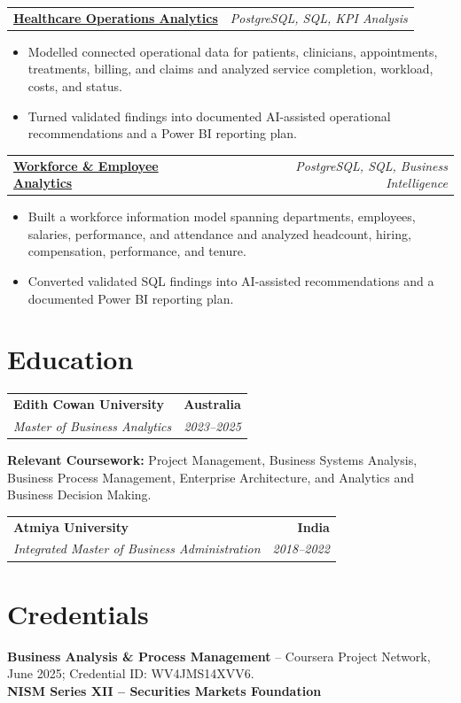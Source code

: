 \documentclass[letterpaper,10pt]{article}
\makeatletter
\newcommand{\role}[4]{%
  \begin{tabularx}{\textwidth}{@{}Xr@{}}
    \textbf{#1} & \textbf{#2} \\
    \textit{#3} & \textit{#4}
  \end{tabularx}\vspace{-1pt}
}
\newcommand{\project}[2]{%
  \begin{tabularx}{\textwidth}{@{}Xr@{}}
    \textbf{#1} & \textit{#2}
  \end{tabularx}\vspace{-1pt}
}
\makeatother
\begin{document}
\project{\href{https://github.com/jainalimehta/Healthcare-Analytics}{Healthcare Operations Analytics}}{PostgreSQL, SQL, KPI Analysis}
\begin{itemize}
  \item Modelled connected operational data for patients, clinicians, appointments, treatments, billing, and claims and analyzed service completion, workload, costs, and status.
  \item Turned validated findings into documented AI-assisted operational recommendations and a Power BI reporting plan.
\end{itemize}
\vspace{1pt}

\project{\href{https://github.com/jainalimehta/HR-Analytics}{Workforce \& Employee Analytics}}{PostgreSQL, SQL, Business Intelligence}
\begin{itemize}
  \item Built a workforce information model spanning departments, employees, salaries, performance, and attendance and analyzed headcount, hiring, compensation, performance, and tenure.
  \item Converted validated SQL findings into AI-assisted recommendations and a documented Power BI reporting plan.
\end{itemize}

\section{Education}
\role{Edith Cowan University}{Australia}{Master of Business Analytics}{2023--2025}
\small\textbf{Relevant Coursework:} Project Management, Business Systems Analysis, Business Process Management, Enterprise Architecture, and Analytics and Business Decision Making.\\[2pt]
\role{Atmiya University}{India}{Integrated Master of Business Administration}{2018--2022}

\section{Credentials}
\small\textbf{Business Analysis \& Process Management} -- Coursera Project Network, June 2025; Credential ID: WV4JMS14XVV6.\\[-0.2pt]
\small\textbf{NISM Series XII -- Securities Markets Foundation}
\end{document}
